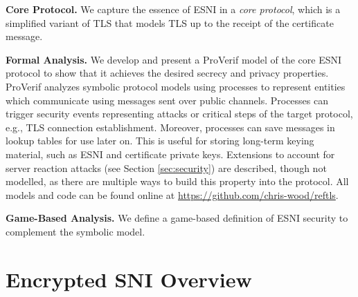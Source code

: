 \documentclass{article}
\theoremstyle{definition}
\theoremstyle{definition}
\begin{document}
\textbf{Core Protocol.} We capture the essence of ESNI in a \emph{core protocol}, which is a simplified variant
of TLS that models TLS up to the receipt of the certificate message.

\textbf{Formal Analysis.} We develop and present a ProVerif model of the core ESNI protocol to show that it
achieves the desired secrecy and privacy properties.  ProVerif analyzes symbolic protocol models using 
processes to represent entities which communicate using messages sent over public channels. Processes
can trigger security events representing attacks or critical steps of the target protocol, e.g., TLS connection establishment.
Moreover, processes can save messages in lookup tables for use later on. This is useful for storing long-term keying
material, such as ESNI and certificate private keys. Extensions to account for server reaction attacks 
(see Section \ref{sec:security}) are described, though not modelled, as there are multiple ways to build 
this property into the protocol. All models and code can be found online at \url{https://github.com/chris-wood/reftls}.

\textbf{Game-Based Analysis.} We define a game-based definition of ESNI security to complement the symbolic model.

\section{Encrypted SNI Overview}

\end{document}
